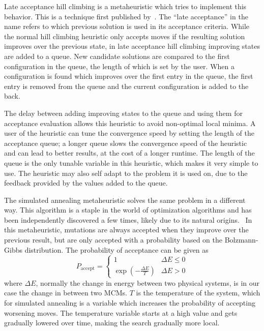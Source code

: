 Late acceptance hill climbing is a metaheuristic which tries to implement this behavior. This is a technique first published by~\citet{lateAcceptanceHillClimbing}. The ``late acceptance'' in the name refers to which previous solution is used in its acceptance criteria. While the normal hill climbing heuristic only accepts moves if the resulting solution improves over the previous state, in late acceptance hill climbing improving states are added to a queue. New candidate solutions are compared to the first configuration in the queue, the length of which is set by the user. When a configuration is found which improves over the first entry in the queue, the first entry is removed from the queue and the current configuration is added to the back.

The delay between adding improving states to the queue and using them for acceptance evaluation allows this heuristic to avoid non-optimal local minima. A user of the heuristic can tune the convergence speed by setting the length of the acceptance queue; a longer queue slows the convergence speed of the heuristic and can lead to better results, at the cost of a longer runtime. The length of the queue is the only tunable variable in this heuristic, which makes it very simple to use. The heuristic may also self adapt to the problem it is used on, due to the feedback provided by the values added to the queue.

The simulated annealing metaheuristic solves the same problem in a different way. This algorithm is a staple in the world of optimization algorithms and has been independently discovered a few times, likely due to its natural origins.~\cite{annealingKirkpatrick,annealingCerny} In this metaheuristic, mutations are always accepted when they improve over the previous result, but are only accepted with a probability based on the Bolzmann-Gibbs distribution. The probability of acceptance can be given as
\begin{equation}\label{bolzmann}
  P_\text{accept} =
  \begin{cases}
    1 & \Delta E \le 0 \\
    \exp(-\frac{\Delta E}{T}) & \Delta E > 0
  \end{cases}
\end{equation}
where \(\Delta E\), normally the change in energy between two physical systems, is in our case the change in \loge{} between two MCMs. \(T\) is the temperature of the system, which for simulated annealing is a variable which increases the probability of accepting worsening moves. The temperature variable starts at a high value and gets gradually lowered over time, making the search gradually more local.

